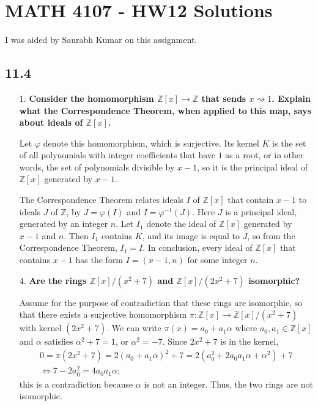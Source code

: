 \documentclass[a4paper,12pt]{article}
\begin{document}
\section*{MATH 4107 - HW12 Solutions}

I was aided by Saurabh Kumar on this assignment.
\subsection*{11.4}
\begin{enumerate}
    \item[1.]
        \boldmath
        \textbf{Consider the homomorphism $\mathbb{Z}[x] \to \mathbb{Z}$ that sends $x \rightsquigarrow 1$. Explain what the Correspondence Theorem, when applied to this map, says about ideals of $\mathbb{Z}[x]$.} \par
        \unboldmath
        Let $\varphi$ denote this homomorphism, which is surjective. Its kernel $K$ is the set of all polynomials with integer coefficients that have $1$ as a root, or in other words, the set of polynomials divisible by $x - 1$, so it is the principal ideal of $\mathbb{Z}[x]$ generated by $x - 1$. \par
        The Correspondence Theorem relates ideals $I$ of $\mathbb{Z}[x]$ that contain $x - 1$ to ideals $J$ of $\mathbb{Z}$, by $J = \varphi(I)$ and $I = \varphi^{-1}(J)$. Here $J$ is a principal ideal, generated by an integer $n$. Let $I_1$ denote the ideal of $\mathbb{Z}[x]$ generated by $x - 1$ and $n$. Then $I_1$ contains $K$, and its image is equal to $J$, so from the Correspondence Theorem, $I_1 = I$. In conclusion, every ideal of $\mathbb{Z}[x]$ that contains $x - 1$ has the form $I = (x - 1, n)$ for some integer $n$.

    \item[4.]
        \boldmath
        \textbf{Are the rings $\mathbb{Z}[x]/(x^2 + 7)$ and $\mathbb{Z}[x]/(2x^2 + 7)$ isomorphic?} \par
        \unboldmath
        Assume for the purpose of contradiction that these rings are isomorphic, so that there exists a surjective homomorphism $\pi : \mathbb{Z}[x] \to \mathbb{Z}[x]/(x^2 + 7)$ with kernel $(2x^2 + 7)$. We can write $\pi(x) = a_0 + a_1 \alpha$ where $a_0, a_1 \in \mathbb{Z}[x]$ and $\alpha$ satisfies $\alpha^2 + 7 = 1$, or $\alpha^2 = -7$. Since $2x^2 + 7$ is in the kernel,
        \begin{gather*}
            0 = \pi(2x^2 + 7) = 2(a_0 + a_1 \alpha)^2 + 7 = 2(a_0^2 + 2a_0 a_1 \alpha + \alpha^2) + 7 \\
            \Leftrightarrow 7 - 2a_0^2 = 4a_0 a_1 \alpha;
        \end{gather*}
        this is a contradiction because $\alpha$ is not an integer. Thus, the two rings are not isomorphic.
\end{enumerate}
\end{document}

